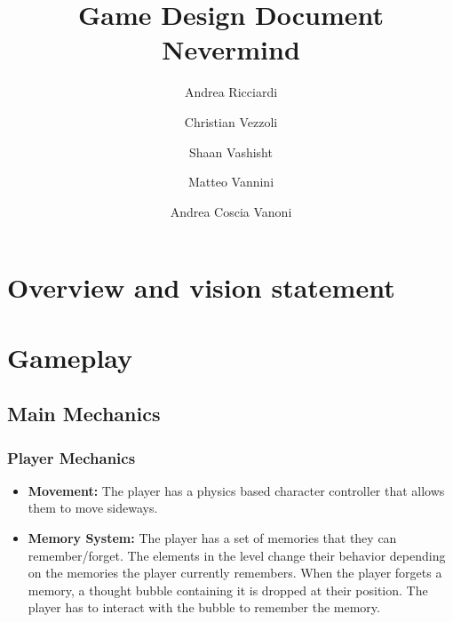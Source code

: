 \documentclass{article}
\title{
    Game Design Document\\
    Nevermind
}
\author{Andrea Ricciardi \and Christian Vezzoli \and Shaan Vashisht \and Matteo Vannini \and Andrea Coscia Vanoni}
\begin{document}
\maketitle
\clearpage

\tableofcontents
\clearpage

\section{Overview and vision statement}

\section{Gameplay}
\subsection{Main Mechanics}
\subsubsection{Player Mechanics}
\begin{itemize}
    \item \textbf{Movement:} The player has a physics based character controller that allows them to move sideways.
    \item \textbf{Memory System:} The player has a set of memories that they can remember/forget. 
    The elements in the level change their behavior depending on the memories the player currently remembers.
    When the player forgets a memory, a thought bubble containing it is dropped at their position. The player has to interact with the bubble to remember the memory.
\end{itemize}
\end{document}
